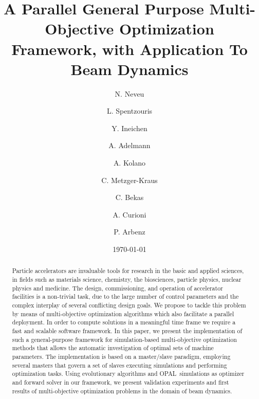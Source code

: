 \documentclass[%
reprint,
amsmath,amssymb,
aps,
]{revtex4-1}
\begin{document}
\title{A Parallel General Purpose Multi-Objective Optimization Framework,
  with Application To Beam Dynamics}



\author{N. Neveu}

\author{L. Spentzouris}


\author{Y. Ineichen }
%


\author{A. Adelmann}
\author{A. Kolano}
\author{C. Metzger-Kraus}
%

\author{C. Bekas}
\author{A. Curioni}

%

\author{P. Arbenz}
%

\date{\today}%


\begin{abstract}
Particle accelerators are invaluable tools for research in the basic and
  applied sciences, in fields such as materials science, chemistry,
  the biosciences, particle physics, nuclear physics and medicine.
The design, commissioning, and operation of accelerator facilities is a
  non-trivial task, due to the large number of control parameters and the
  complex interplay of several conflicting design goals.
We propose to tackle this problem by means of multi-objective optimization
  algorithms which also facilitate a parallel deployment.
In order to compute solutions in a meaningful time frame we require a fast
  and scalable software framework.
In this paper, we present the implementation of such a general-purpose
  framework for simulation-based multi-objective optimization methods that
  allows the automatic investigation of optimal sets of machine parameters.
The implementation is based on a master/slave paradigm, employing several
  masters that govern a set of slaves executing simulations and performing
  optimization tasks.
Using evolutionary algorithms and \textsc{OPAL}~simulations as optimizer and
  forward solver in our framework, we present validation experiments and first
  results of multi-objective optimization problems in the domain of beam
  dynamics.
  
\end{abstract}
\end{document}
